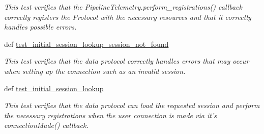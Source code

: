 \begin{DoxyCompactItemize}
\begin{DoxyCompactList}\small\item\em This test verifies that the Pipeline\-Telemetry.\-perform\-\_\-registrations() callback correctly registers the Protocol with the necessary resources and that it correctly handles possible errors. \end{DoxyCompactList}\item 
def \hyperlink{classhwm_1_1network_1_1protocols_1_1tests_1_1test__data__protocol_1_1_test_pipeline_data_protocol_a9d3b0245d069f9cbd1056f8f328c27b9}{test\-\_\-initial\-\_\-session\-\_\-lookup\-\_\-session\-\_\-not\-\_\-found}
\begin{DoxyCompactList}\small\item\em This test verifies that the data protocol correctly handles errors that may occur when setting up the connection such as an invalid session. \end{DoxyCompactList}\item 
def \hyperlink{classhwm_1_1network_1_1protocols_1_1tests_1_1test__data__protocol_1_1_test_pipeline_data_protocol_acb0b4c746db9a625a0633189796d2e23}{test\-\_\-initial\-\_\-session\-\_\-lookup}
\begin{DoxyCompactList}\small\item\em This test verifies that the data protocol can load the requested session and perform the necessary registrations when the user connection is made via it's connection\-Made() callback. \end{DoxyCompactList}\end{DoxyCompactItemize}
